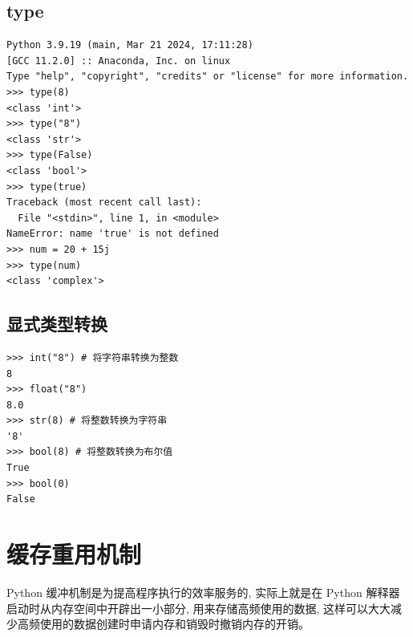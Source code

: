 \subsection{type}
\begin{lstlisting}[style=demostyle,numbers=none]
Python 3.9.19 (main, Mar 21 2024, 17:11:28)
[GCC 11.2.0] :: Anaconda, Inc. on linux
Type "help", "copyright", "credits" or "license" for more information.
>>> type(8)
<class 'int'>
>>> type("8")
<class 'str'>
>>> type(False)
<class 'bool'>
>>> type(true)
Traceback (most recent call last):
  File "<stdin>", line 1, in <module>
NameError: name 'true' is not defined
>>> num = 20 + 15j
>>> type(num)
<class 'complex'>
\end{lstlisting}

\subsection{显式类型转换}
\begin{lstlisting}[style=demostyle,numbers=none]
>>> int("8") # 将字符串转换为整数
8
>>> float("8")
8.0
>>> str(8) # 将整数转换为字符串
'8'
>>> bool(8) # 将整数转换为布尔值
True
>>> bool(0)
False
\end{lstlisting}

\section{缓存重用机制}
Python 缓冲机制是为提高程序执行的效率服务的, 实际上就是在 Python 解释器启动时从内存空间中开辟出一小部分, 
用来存储高频使用的数据, 这样可以大大减少高频使用的数据创建时申请内存和销毁时撤销内存的开销。

